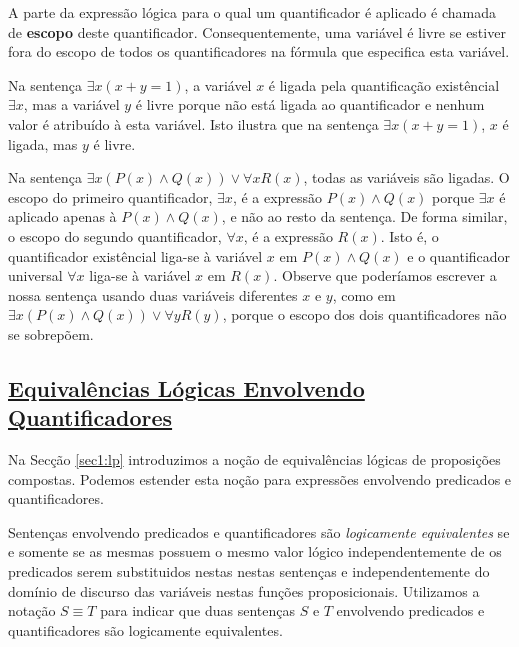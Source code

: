 A parte da expressão lógica para o qual um quantificador é aplicado é chamada de
\textbf{escopo} deste quantificador. Consequentemente, uma variável é livre se
estiver fora do escopo de todos os quantificadores na fórmula que especifica
esta variável.

\begin{exmp}
\label{exem142}
Na sentença $\exists x(x+y=1)$, a variável $x$ é ligada pela quantificação
existêncial $\exists x$, mas a variável $y$ é livre porque não está ligada ao
quantificador e nenhum valor é atribuído à esta variável. Isto ilustra que na
sentença $\exists x(x+y=1)$, $x$ é ligada, mas $y$ é livre.

Na sentença $\exists x(P(x) \land Q(x)) \lor \forall xR(x)$, todas as variáveis
são ligadas. O escopo do primeiro quantificador, $\exists x$, é a expressão
$P(x) \land Q(x)$ porque $\exists x$ é aplicado apenas à $P(x) \land Q(x)$, e
não ao resto da sentença. De forma similar, o escopo do segundo quantificador,
$\forall x$, é a expressão $R(x)$. Isto é, o quantificador existêncial liga-se à
variável $x$ em $P(x) \land Q(x)$ e o quantificador universal $\forall x$
liga-se à variável $x$ em $R(x)$. Observe que poderíamos escrever a nossa
sentença usando duas variáveis diferentes $x$ e $y$, como em $\exists x(P(x)
\land Q(x)) \lor \forall yR(y)$, porque o escopo dos dois quantificadores não se
sobrepõem. 
\end{exmp} 


\subsection*{\underline{Equivalências Lógicas Envolvendo Quantificadores}}

Na Secção \ref{sec1:lp} introduzimos a noção de equivalências lógicas de
proposições compostas. Podemos estender esta noção para expressões envolvendo
predicados e quantificadores.

\label{def111}
\begin{defn}
Sentenças envolvendo predicados e quantificadores são \emph{logicamente
equivalentes} se e somente se as mesmas possuem o mesmo valor lógico
independentemente de os predicados serem substituidos nestas nestas sentenças e
independentemente do domínio de discurso das variáveis nestas funções
proposicionais. Utilizamos a notação $S \equiv T$ para indicar que duas
sentenças $S$ e $T$ envolvendo predicados e quantificadores são logicamente
equivalentes.
\end{defn}


